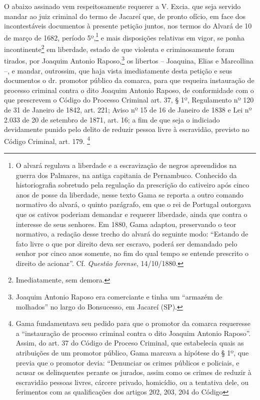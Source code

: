 {O abaixo assinado vem respeitosamente requerer a V. Excia. que seja
servido mandar ao juiz criminal do termo de Jacareí que, de pronto
ofício, em face dos incontestáveis documentos à presente petição juntos,
nos termos do Alvará de 10 de março de 1682, período 5º,\footnote{ O
  alvará regulava a liberdade e a escravização de negros apreendidos na
  guerra dos Palmares, na antiga capitania de Pernambuco. Conhecido da
  historiografia sobretudo pela regulação da prescrição do cativeiro
  após cinco anos de posse da liberdade, nesse texto Gama se reporta a
  outro comando normativo do alvará, o quinto parágrafo, em que o rei de
  Portugal outorgava que os cativos poderiam demandar e requerer
  liberdade, ainda que contra o interesse de seus senhores. Em 1880,
  Gama adaptou, preservando o teor normativo, a redação desse trecho do
  alvará do seguinte modo: ``Estando de fato livre o que por direito deva
  ser escravo, poderá ser demandado pelo senhor por cinco anos somente,
  no fim do qual tempo se entende prescrito o direito de acionar''. Cf.
  \emph{Questão forense}, 14/10/1880.} e mais disposições relativas em
vigor, se ponha incontinente\footnote{ Imediatamente, sem demora.} em
liberdade, estado de que violenta e criminosamente foram tirados, por
Joaquim Antonio Raposo,\footnote{ Joaquim Antonio Raposo era
  comerciante e tinha um ``armazém de molhados'' no largo do Bonsucesso,
  em Jacareí (SP).} os libertos -- Joaquina, Elias e Marcollina --, e
mandar, outrossim, que haja vista imediatamente desta petição e seus
documentos o dr. promotor público da comarca, para que requeira
instauração de processo criminal contra o dito Joaquim Antonio Raposo,
de conformidade com o que prescrevem o Código do Processo Criminal art.
37, § 1º, Regulamento nº 120 de 31 de Janeiro de 1842, art. 221; Aviso
nº 15 de 16 de Janeiro de 1838 e Lei nº 2.033 de 20 de setembro de 1871,
art. 16; a fim de que seja o indiciado devidamente punido pelo delito de
reduzir pessoa livre à escravidão, previsto no Código Criminal, art.
179. \footnote{ Gama fundamentava seu pedido para que o promotor da
  comarca requeresse a ``instauração de processo criminal contra o dito
  Joaquim Antonio Raposo''. Assim, do art. 37 do Código de Proceso
  Criminal, que estabelecia quais as atribuições de um promotor público,
  Gama marcava a hipótese do § 1º, que previa que o promotor devia:
  ``Denunciar os crimes públicos e policiais, e acusar os delinquentes
  perante os jurados, assim como os crimes de reduzir à escravidão
  pessoas livres, cárcere privado, homicídio, ou a tentativa dele, ou
  ferimentos com as qualificações dos artigos 202, 203, 204 do Código
}}
